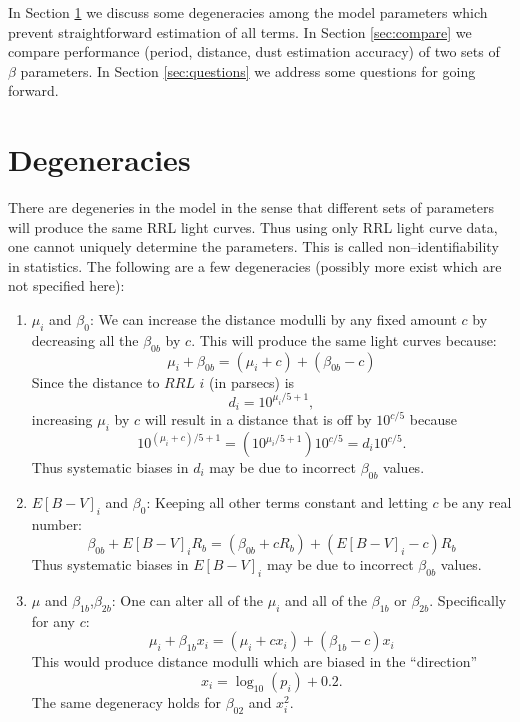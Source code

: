 \documentclass[12pt]{article}
\begin{document}
In Section \ref{sec:nonident} we discuss some degeneracies among the model parameters which prevent straightforward estimation of all terms. In Section \ref{sec:compare} we compare performance (period, distance, dust estimation accuracy) of two sets of $\beta$ parameters. In Section \ref{sec:questions} we address some questions for going forward.

\section{Degeneracies}
\label{sec:nonident}

There are degeneries in the model in the sense that different sets of parameters will produce the same RRL light curves. Thus using only RRL light curve data, one cannot uniquely determine the parameters. This is called non--identifiability in statistics. The following are a few degeneracies (possibly more exist which are not specified here):
\begin{enumerate}
\item $\mu_i$ and $\beta_{0}$: We can increase the distance modulli by any fixed amount $c$ by decreasing all the $\beta_{0b}$ by $c$. This will produce the same light curves because:
  \begin{equation*}
    \mu_i + \beta_{0b} = (\mu_i + c) + (\beta_{0b}-c)
  \end{equation*}
  Since the distance to $RRL$ $i$ (in parsecs) is
  \begin{equation*}
    d_i = 10^{\mu_i/5 + 1},
  \end{equation*}
  increasing $\mu_i$ by $c$ will result in a distance that is off by $10^{c/5}$ because
  \begin{equation*}
   10^{(\mu_i + c)/5 + 1} = (10^{\mu_i/5 + 1})10^{c/5} = d_i10^{c/5}.
  \end{equation*}
  Thus systematic biases in $d_i$ may be due to incorrect $\beta_{0b}$ values.
\item $E[B-V]_i$ and $\beta_{0}$: Keeping all other terms constant and letting $c$ be any real number:
  \begin{equation*}
    \beta_{0b} + E[B-V]_iR_b = (\beta_{0b} + cR_b) + (E[B-V]_i-c)R_b
  \end{equation*}
  Thus systematic biases in $E[B-V]_i$ may be due to incorrect $\beta_{0b}$ values.
\item $\mu$ and $\beta_{1b}$,$\beta_{2b}$: One can alter all of the $\mu_i$ and all of the $\beta_{1b}$ or $\beta_{2b}$. Specifically for any $c$:
  \begin{equation*}
    \mu_i + \beta_{1b}x_i = (\mu_i + cx_i) + (\beta_{1b}-c)x_i
  \end{equation*}
  This would produce distance modulli which are biased in the ``direction''
  \begin{equation*}
    x_i=\log_{10}(p_i)+0.2.
  \end{equation*}
  The same degeneracy holds for $\beta_{02}$ and $x_i^2$.
\end{enumerate}
\end{document}
